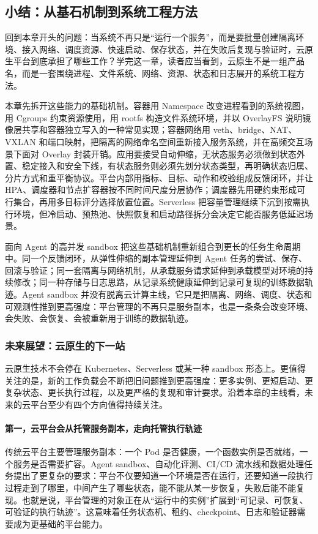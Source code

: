 \subsection{小结：从基石机制到系统工程方法}
\label{sec6:summary}

回到本章开头的问题：当系统不再只是“运行一个服务”，而是要批量创建隔离环境、接入网络、调度资源、快速启动、保存状态，并在失败后复现与验证时，云原生平台到底承担了哪些工作？学完这一章，读者应当看到，云原生不是一组产品名，而是一套围绕进程、文件系统、网络、资源、状态和日志展开的系统工程方法。

本章先拆开这些能力的基础机制。容器用 Namespace 改变进程看到的系统视图，用 Cgroups 约束资源使用，用 rootfs 构造文件系统环境，并以 OverlayFS 说明镜像层共享和容器独立写入的一种常见实现；容器网络用 veth、bridge、NAT、VXLAN 和端口映射，把隔离的网络命名空间重新接入服务系统，并在高频交互场景下面对 Overlay 封装开销。应用要接受自动伸缩，无状态服务必须做到状态外置、稳定接入和安全下线，有状态服务则必须先划分状态类型，再明确状态归属、分片方式和重平衡协议。平台内部用指标、目标、动作和校验组成反馈闭环，并让 HPA、调度器和节点扩容器按不同时间尺度分层协作；调度器先用硬约束形成可行集合，再用多目标评分选择放置位置。Serverless 把容量管理继续下沉到按需执行环境，但冷启动、预热池、快照恢复和启动路径拆分会决定它能否服务低延迟场景。

面向 Agent 的高并发 sandbox 把这些基础机制重新组合到更长的任务生命周期中。同一个反馈闭环，从弹性伸缩的副本管理延伸到 Agent 任务的尝试、保存、回滚与验证；同一套隔离与网络机制，从承载服务请求延伸到承载模型对环境的持续修改；同一种存储与日志思路，从记录系统健康延伸到记录可复现的训练数据轨迹。Agent sandbox 并没有脱离云计算主线，它只是把隔离、网络、调度、状态和可观测性推到更高强度：平台管理的不再只是服务副本，也是一条条会改变环境、会失败、会恢复、会被重新用于训练的数据轨迹。

\subsubsection{未来展望：云原生的下一站}
\label{sec6:future-cloud-native}

云原生技术不会停在 Kubernetes、Serverless 或某一种 sandbox 形态上。更值得关注的是，新的工作负载会不断把旧问题推到更高强度：更多实例、更短启动、更复杂状态、更长执行过程，以及更严格的复现和审计要求。沿着本章的主线看，未来的云平台至少有四个方向值得持续关注。

\paragraph{第一，云平台会从托管服务副本，走向托管执行轨迹}
传统云平台主要管理服务副本：一个 Pod 是否健康，一个函数实例是否就绪，一个服务是否需要扩容。Agent sandbox、自动化评测、CI/CD 流水线和数据处理任务提出了更复杂的要求：平台不仅要知道一个环境是否在运行，还要知道一段执行过程走到了哪里，中间产生了哪些状态，能不能从某一步恢复，失败后能不能复现。也就是说，平台管理的对象正在从“运行中的实例”扩展到“可记录、可恢复、可验证的执行轨迹”。这意味着任务状态机、租约、checkpoint、日志和验证器需要成为更基础的平台能力。

